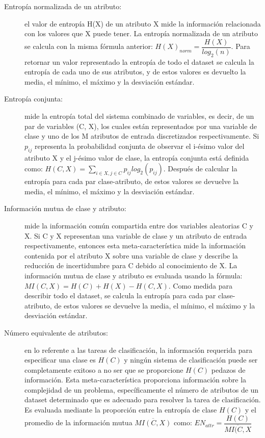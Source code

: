 \begin{itemize}
\begin{description}
		\item[Entropía normalizada de un atributo:] el valor de entropía H(X) de un atributo X mide la información relacionada con los valores que X puede tener. La entropía normalizada de un atributo se calcula con la misma fórmula anterior: $H(X)_{norm} = \dfrac{H(X)}{log_2(n)}$. Para retornar un valor representado la entropía de todo el dataset se calcula la entropía de cada uno de sus atributos, y de estos valores es devuelto la media, el mínimo, el máximo y la desviación estándar.
		\item[Entropía conjunta:] mide la entropía total del sistema combinado de variables, es decir, de un par de variables (C, X), los cuales están representados por una variable de clase y uno de los M atributos de entrada discretizados respectivamente. Si $p_{ij}$ representa la probabilidad conjunta de observar el i-ésimo valor del atributo X y el j-ésimo valor de clase, la entropía conjunta está definida como: $H(C, X) = \sum_{i \in X, j \in C} p_{ij} log_2(p_{ij})$. Después de calcular la entropía para cada par clase-atributo, de estos valores se devuelve la media, el mínimo, el máximo y la desviación estándar.
		\item[Información mutua de clase y atributo:] mide la información común compartida entre dos variables aleatorias C y X. Si C y X representan una variable de clase y un atributo de entrada respectivamente, entonces esta meta-característica mide la información contenida por el atributo X sobre una variable de clase y describe la reducción de incertidumbre para C debido al conocimiento de X. La información mutua de clase y atributo es evaluada usando la fórmula: $MI(C, X) = H(C) + H(X) - H(C, X)$. Como medida para describir todo el dataset, se calcula la entropía para cada par clase-atributo, de estos valores se devuelve la media, el mínimo, el máximo y la desviación estándar.
		\item[Número equivalente de atributos:] en lo referente a las tareas de clasificación, la información requerida para especificar una clase es $H(C)$ y ningún sistema de clasificación puede ser completamente exitoso a no ser que se proporcione  $H(C)$ pedazos de información. Esta meta-característica proporciona información sobre la complejidad de un problema, específicamente el número de atributos de un dataset determinado que es adecuado para resolver la tarea de clasificación. Es evaluada mediante la proporción entre la entropía de clase $H(C)$ y el promedio de la información mutua $\overline{MI(C, X)}$ como: $EN_{attr} = \dfrac{H(C)}{\overline{MI(C, X}}$

\end{description}
\end{itemize}
